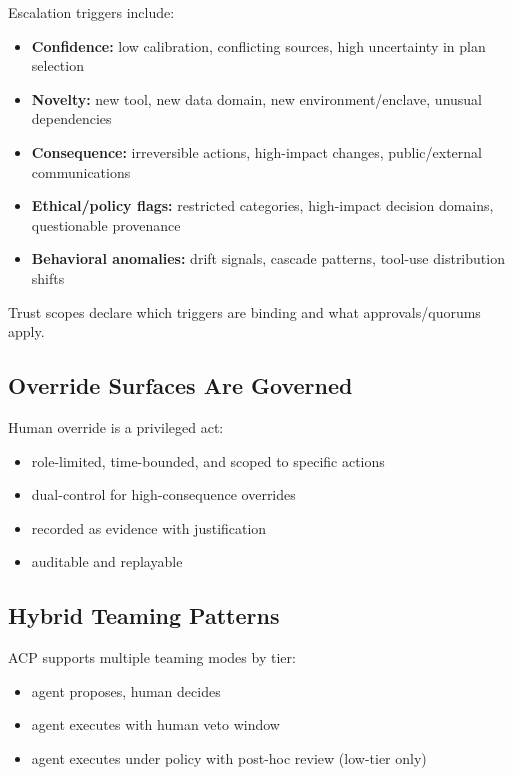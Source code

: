 \documentclass[11pt]{article}
\begin{document}
Escalation triggers include:

\begin{itemize}
\tightlist
\item
  \textbf{Confidence:} low calibration, conflicting sources, high
  uncertainty in plan selection
\item
  \textbf{Novelty:} new tool, new data domain, new environment/enclave,
  unusual dependencies
\item
  \textbf{Consequence:} irreversible actions, high-impact changes,
  public/external communications
\item
  \textbf{Ethical/policy flags:} restricted categories, high-impact
  decision domains, questionable provenance
\item
  \textbf{Behavioral anomalies:} drift signals, cascade patterns,
  tool-use distribution shifts
\end{itemize}

Trust scopes declare which triggers are binding and what
approvals/quorums apply.

\hypertarget{override-surfaces-are-governed}{%
\subsection{Override Surfaces Are Governed}\label{override-surfaces-are-governed}}

Human override is a privileged act:

\begin{itemize}
\tightlist
\item
  role-limited, time-bounded, and scoped to specific actions
\item
  dual-control for high-consequence overrides
\item
  recorded as evidence with justification
\item
  auditable and replayable
\end{itemize}

\hypertarget{hybrid-teaming-patterns}{%
\subsection{Hybrid Teaming Patterns}\label{hybrid-teaming-patterns}}

ACP supports multiple teaming modes by tier:

\begin{itemize}
\tightlist
\item
  agent proposes, human decides
\item
  agent executes with human veto window
\item
  agent executes under policy with post-hoc review (low-tier only)
\end{itemize}
\end{document}

